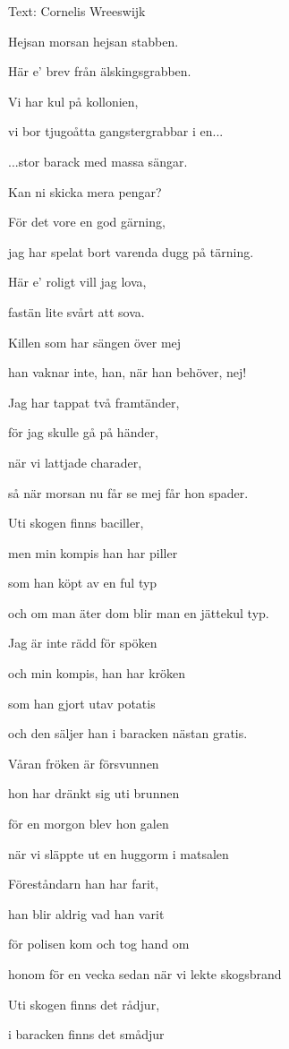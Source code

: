 Text: Cornelis Wreeswijk \bigskip

Hejsan morsan hejsan stabben.

Här e’ brev från älskingsgrabben.

Vi har kul på kollonien,

vi bor tjugoåtta gangstergrabbar i en...\bigskip

...stor barack med massa sängar.

Kan ni skicka mera pengar?

För det vore en god gärning,

jag har spelat bort varenda dugg på tärning.\bigskip

Här e’ roligt vill jag lova,

fastän lite svårt att sova.

Killen som har sängen över mej

han vaknar inte, han, när han behöver, nej!\bigskip

Jag har tappat två framtänder,

för jag skulle gå på händer,

när vi lattjade charader,

så när morsan nu får se mej får hon spader.\bigskip

Uti skogen finns baciller,

men min kompis han har piller

som han köpt av en ful typ

och om man äter dom blir man en jättekul typ.\bigskip

Jag är inte rädd för spöken

och min kompis, han har kröken

som han gjort utav potatis

och den säljer han i baracken nästan gratis.\bigskip\

Våran fröken är försvunnen

hon har dränkt sig uti brunnen

för en morgon blev hon galen

när vi släppte ut en huggorm i matsalen\bigskip

Föreståndarn han har farit,

han blir aldrig vad han varit

för polisen kom och tog hand om

honom för en vecka sedan när vi lekte skogsbrand\bigskip

Uti skogen finns det rådjur,

i baracken finns det smådjur

